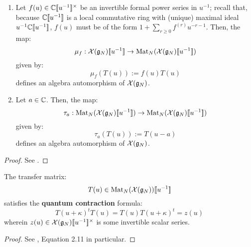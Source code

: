             \begin{lemma} \label{lemma: automorphisms_of_extended_untwisted_yangians}
                \begin{enumerate}
                    \item Let $f(u) \in \bbC[\![u^{-1}]\!]^{\x}$ be an invertible formal power series in $u^{-1}$; recall that, because $\mathbb{C}[\![u^{-1}]\!]$ is a local commutative ring with (unique) maximal ideal $u^{-1}\mathbb{C}[\![u^{-1}]\!]$, $f(u)$ must be of the form $1 + \sum_{r \geq 0} f^{(r)} u^{-r - 1}$. Then, the map:
                        $$\mu_f: \mathcal{X}(\mathfrak{g}_N)[\![u^{-1}]\!] \to \mathrm{Mat}_N(\mathcal{X}(\mathfrak{g}_N)[\![u^{-1}]\!])$$
                    given by:
                        $$\mu_f( T(u) ) := f(u) T(u)$$
                    defines an algebra automorphism of $\mathcal{X}(\mathfrak{g}_N)$.
                    \item Let $a \in \mathbb{C}$. Then, the map:
                        $$\tau_a: \mathrm{Mat}_N(\mathcal{X}(\mathfrak{g}_N)[\![u^{-1}]\!]) \to \mathrm{Mat}_N(\mathcal{X}(\mathfrak{g}_N)[\![u^{-1}]\!])$$
                    given by:
                        $$\tau_a( T(u) ) := T(u - a)$$
                    defines an algebra automorphism of $\mathcal{X}(\mathfrak{g}_N)$.
                \end{enumerate}
            \end{lemma}
                \begin{proof}
                    See \cite[Section 2]{guay_regelskis_twisted_yangians_for_symmetric_pairs_of_types_BCD}.
                \end{proof}

            \begin{lemma} \label{lemma: quantum_contractions}
                The transfer matrix:
                    $$T(u) \in \mathrm{Mat}_N( \mathcal{X}(\mathfrak{g}_N) )[\![u^{-1}]\!]$$
                satisfies the \textbf{quantum contraction} formula:
                    \begin{equation} \label{equation: quantum_contraction}
                        T(u + \kappa)^t T(u) = T(u) T(u + \kappa)^t = z(u)
                    \end{equation}
                wherein $z(u) \in \calX(\g_N)[\![u^{-1}]\!]^{\x}$ is some invertible scalar series.
            \end{lemma}
                \begin{proof}
                    See \cite[Section 2]{guay_regelskis_twisted_yangians_for_symmetric_pairs_of_types_BCD}, Equation 2.11 in particular.
                \end{proof}
                
